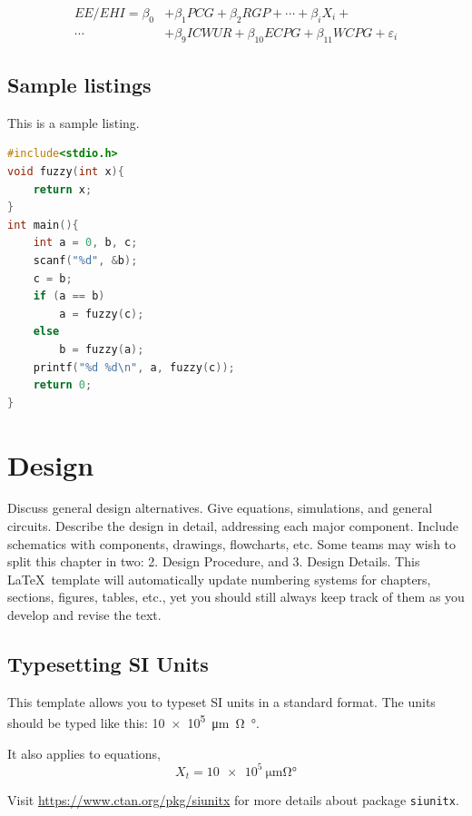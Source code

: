 \documentclass{senior-design}
\begin{document}
\begin{equation}
    \begin{aligned}
        EE / EHI = \beta_0 & + \beta_1 PCG + \beta_2 RGP + \cdots + \beta_i X_i +              \\
        \cdots             & + \beta_9 ICWUR + \beta_{10} ECPG + \beta_11 WCPG + \varepsilon_i
    \end{aligned}
\end{equation}

\section{Sample listings}
This is a sample listing.
\begin{lstlisting}[language=c]
#include<stdio.h>
void fuzzy(int x){
    return x;
}
int main(){
    int a = 0, b, c;
    scanf("%d", &b);
    c = b;
    if (a == b)
        a = fuzzy(c);
    else
        b = fuzzy(a);
    printf("%d %d\n", a, fuzzy(c));
    return 0;
}
\end{lstlisting}

\chapter{Design}
Discuss general design alternatives. Give equations, simulations, and general circuits. Describe the design in detail, addressing each major component. Include schematics with components, drawings, flowcharts, etc. Some teams may wish to split this chapter in two: 2. Design Procedure, and 3. Design Details. This \LaTeX~template will automatically update numbering systems for chapters, sections, figures, tables, etc., yet you should still always keep track of them as you develop and revise the text.

\section{Typesetting SI Units}
This template allows you to typeset SI units in a standard format. The units should be typed like this: \SI{10e5}{\um\ohm\degree}.

It also applies to equations,
\begin{equation}
    X_{t}=\SI{10e5}{\um\ohm\degree}
\end{equation}

Visit \url{https://www.ctan.org/pkg/siunitx} for more details about package \texttt{siunitx}.
\end{document}
